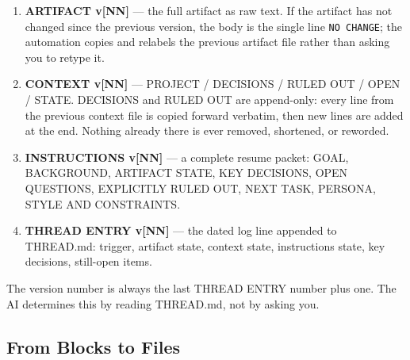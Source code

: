 \documentclass[12pt,letterpaper]{article}
\begin{document}
\begin{enumerate}
\item \textbf{ARTIFACT v[NN]} --- the full artifact as raw text. If the
      artifact has not changed since the previous version, the body is
      the single line \texttt{NO CHANGE}; the automation copies and
      relabels the previous artifact file rather than asking you to
      retype it.
\item \textbf{CONTEXT v[NN]} --- PROJECT / DECISIONS / RULED OUT / OPEN /
      STATE. DECISIONS and RULED OUT are append-only: every line from the
      previous context file is copied forward verbatim, then new lines
      are added at the end. Nothing already there is ever removed,
      shortened, or reworded.
\item \textbf{INSTRUCTIONS v[NN]} --- a complete resume packet: GOAL,
      BACKGROUND, ARTIFACT STATE, KEY DECISIONS, OPEN QUESTIONS,
      EXPLICITLY RULED OUT, NEXT TASK, PERSONA, STYLE AND CONSTRAINTS.
\item \textbf{THREAD ENTRY v[NN]} --- the dated log line appended to
      THREAD.md: trigger, artifact state, context state, instructions
      state, key decisions, still-open items.
\end{enumerate}

The version number is always the last THREAD ENTRY number plus one. The
AI determines this by reading THREAD.md, not by asking you.

\subsection{From Blocks to Files}
\end{document}
